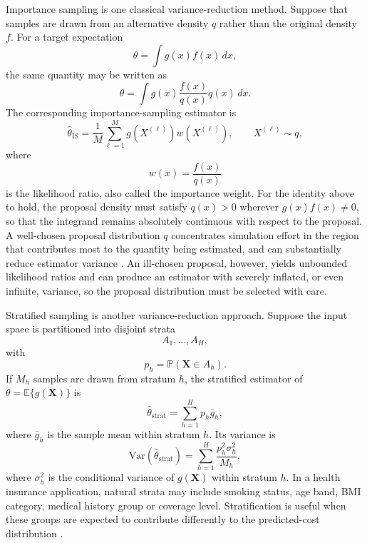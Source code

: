 \noindent
Importance sampling is one classical variance-reduction method. Suppose that
samples are drawn from an alternative density \(q\) rather than the original
density \(f\). For a target expectation
\[
    \theta
    =
    \int
    g(x)f(x)\,dx,
\]
the same quantity may be written as
\[
    \theta
    =
    \int
    g(x)
    \frac{f(x)}{q(x)}
    q(x)\,dx.
\]
The corresponding importance-sampling estimator is
\[
    \widehat{\theta}_{\mathrm{IS}}
    =
    \frac{1}{M}
    \sum_{\ell=1}^{M}
    g
    \!\left(
        X^{(\ell)}
    \right)
    w
    \!\left(
        X^{(\ell)}
    \right),
    \qquad
    X^{(\ell)}\sim q,
\]
where
\[
    w(x)
    =
    \frac{f(x)}{q(x)}
\]
is the likelihood ratio, also called the importance weight. For the
identity above to hold, the proposal density must satisfy \(q(x)>0\)
wherever \(g(x)f(x)\neq 0\), so that the integrand remains absolutely
continuous with respect to the proposal. A well-chosen
proposal distribution \(q\) concentrates simulation effort in the region that
contributes most to the quantity being estimated, and can substantially reduce
estimator variance \citep{glasserman2004monte,rubinstein2016simulation}. An
ill-chosen proposal, however, yields unbounded likelihood ratios and can
produce an estimator with severely inflated, or even infinite, variance, so
the proposal distribution must be selected with care.

\noindent
Stratified sampling is another variance-reduction approach. Suppose the input
space is partitioned into disjoint strata
\[
    A_1,\ldots,A_H,
\]
with
\[
    p_h
    =
    \mathbb{P}
    \!\left(
        \mathbf{X}\in A_h
    \right).
\]
If \(M_h\) samples are drawn from stratum \(h\), the stratified estimator of
\(\theta=\mathbb{E}\{g(\mathbf{X})\}\) is
\[
    \widehat{\theta}_{\mathrm{strat}}
    =
    \sum_{h=1}^{H}
    p_h
    \overline{g}_h,
\]
where \(\overline{g}_h\) is the sample mean within stratum \(h\). Its variance is
\[
    \mathrm{Var}
    \!\left(
        \widehat{\theta}_{\mathrm{strat}}
    \right)
    =
    \sum_{h=1}^{H}
    \frac{
        p_h^2\sigma_h^2
    }{
        M_h
    },
\]
where \(\sigma_h^2\) is the conditional variance of \(g(\mathbf{X})\) within
stratum \(h\). In a health insurance application, natural strata may include
smoking status, age band, BMI category, medical history group or coverage
level. Stratification is useful when these groups are expected to contribute
differently to the predicted-cost distribution \citep{rubinstein2016simulation}.

